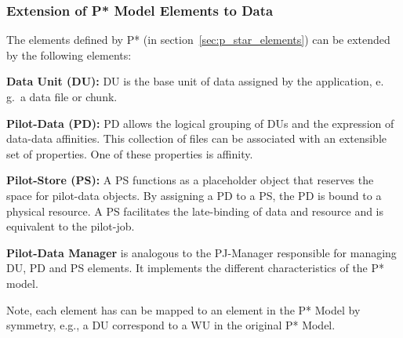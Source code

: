 \documentclass[conference,final]{IEEEtran}
\makeatletter
\def\reduwave{\bgroup \markoverwith{\lower3.5\p@\hbox{\sixly \textcolor{red}{\char58}}}\ULon}
\newcommand{\jwave}[1]{ {\reduwave{#1}}}
\newcommand{\jhanote}[1]{ {\textcolor{red} { ***shantenu: #1 }}}
\newcommand{\alnote}[1]{ {\textcolor{blue} { ***andre: #1 }}}
\newcommand{\jwave}[1]{#1}
\newcommand{\alnote}[1]{}
\newcommand{\jhanote}[1]{}
\makeatother
\begin{document}
\subsubsection*{Extension of P* Model Elements to Data}


The elements defined by P* (in section~\ref{sec:p_star_elements}) can
be extended by the following elements:

\begin{compactenum}[A.]
\item \textbf{Data Unit (DU):} DU is the base unit of data assigned by
  the application,  e.\,g.\ a data file or chunk. 
\item \textbf{Pilot-Data (PD):} PD allows the logical grouping of DUs
  and the expression of data-data affinities. This collection of files
  can be associated with an extensible set of properties. One of these
  properties is affinity. 
\item \textbf{Pilot-Store (PS):} A PS functions as a placeholder
  object that reserves the space for pilot-data objects.  By assigning
  a PD to a PS, the PD is bound to a physical resource.  A PS
  facilitates the late-binding of data and resource and is equivalent
  to the pilot-job.
\item \textbf{Pilot-Data Manager} is analogous to the PJ-Manager
  responsible for managing DU, PD and PS elements. It implements the
  different characteristics of the P* model.
\end{compactenum}
 
Note, each element has can be mapped to an element in the P* Model by
symmetry, e.g., a DU correspond to a WU in the original P* Model.


\end{document}
